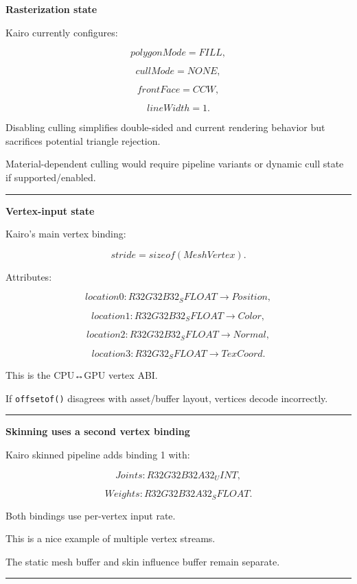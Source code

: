 \textbf{Rasterization state}

Kairo currently configures:

\[
polygonMode=FILL,
\]

\[
cullMode=NONE,
\]

\[
frontFace=CCW,
\]

\[
lineWidth=1.
\]

Disabling culling simplifies double-sided and current rendering behavior but sacrifices potential triangle rejection.

Material-dependent culling would require pipeline variants or dynamic cull state if supported/enabled.

\begin{center}\rule{0.5\linewidth}{0.5pt}\end{center}

\textbf{Vertex-input state}

Kairo's main vertex binding:

\[
stride=sizeof(MeshVertex).
\]

Attributes:

\[
location0:
R32G32B32_SFLOAT
\rightarrow Position,
\]

\[
location1:
R32G32B32_SFLOAT
\rightarrow Color,
\]

\[
location2:
R32G32B32_SFLOAT
\rightarrow Normal,
\]

\[
location3:
R32G32_SFLOAT
\rightarrow TexCoord.
\]

This is the CPU↔GPU vertex ABI.

If \texttt{offsetof()} disagrees with asset/buffer layout, vertices decode incorrectly.

\begin{center}\rule{0.5\linewidth}{0.5pt}\end{center}

\textbf{Skinning uses a second vertex binding}

Kairo skinned pipeline adds binding 1 with:

\[
Joints:
R32G32B32A32_UINT,
\]

\[
Weights:
R32G32B32A32_SFLOAT.
\]

Both bindings use per-vertex input rate.

This is a nice example of multiple vertex streams.

The static mesh buffer and skin influence buffer remain separate.

\begin{center}\rule{0.5\linewidth}{0.5pt}\end{center}

